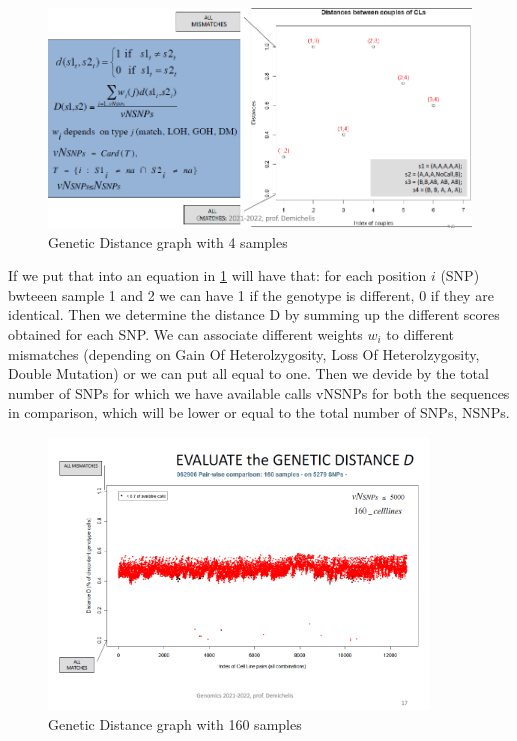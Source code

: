 \begin{figure}[ht]
	\centering
	\includegraphics[width=1\textwidth]{Distance.PNG}
	\caption{Genetic Distance graph with 4 samples}
	\label{fig:Distance} %
\end{figure}

If we put that into an equation in \ref{fig:Distance} will have that: for each
position $i$ (SNP) bwteeen sample 1 and 2 we can have 1 if the genotype is
different, 0 if they are identical. Then we determine the distance D by summing
up the different scores obtained for each SNP. We can associate different
weights $w_i$ to different mismatches (depending on Gain Of Heterolzygosity,
Loss Of Heterolzygosity, Double Mutation) or we can put all equal to one. Then
we devide by the total number of SNPs for which we have available calls vNSNPs
for both the sequences in comparison, which will be lower or equal to the total
number of SNPs, NSNPs. 


\begin{figure}[ht]
	\centering
	\includegraphics[width=0.9\textwidth]{Distance2.PNG}
	\caption{\label{fig:Distance2}Genetic Distance graph with 160 samples}
\end{figure}

